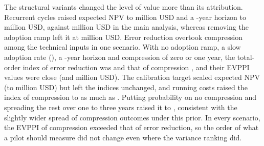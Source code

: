 The structural variants changed the level of value more than its attribution. Recurrent cycles raised expected NPV to \NumRvEVRecurrent million USD and a \NumCfgHorizonLong-year horizon to \NumRvEVHorizonForty million USD, against \NumRvEVBase million USD in the main analysis, whereas removing the adoption ramp left it at \NumRvEVRampStep million USD. Error reduction overtook compression among the technical inputs in one scenario. With no adoption ramp, a slow adoption rate (\NumCfgKLow), a \NumCfgHorizonLong-year horizon and compression of zero or one year, the total-order index of error reduction was \NumRvSTErrConservativeZeroOne and that of compression \NumRvSTCycConservativeZeroOne, and their EVPPI values were close (\NumRvEVPPIErrConservativeZeroOne and \NumRvEVPPICycConservativeZeroOne million USD). The calibration target scaled expected NPV (\NumRvEVTargetQuarter to \NumRvEVTargetOne million USD) but left the indices unchanged, and running costs raised the index of compression to as much as \NumRvSTCycCostHigh. Putting probability \NumCfgZeroMassA on no compression and spreading the rest over one to three years raised it to \NumRvSTCycPriorZeroMass, consistent with the slightly wider spread of compression outcomes under this prior. In every scenario, the EVPPI of compression exceeded that of error reduction, so the order of what a pilot should measure did not change even where the variance ranking did.

